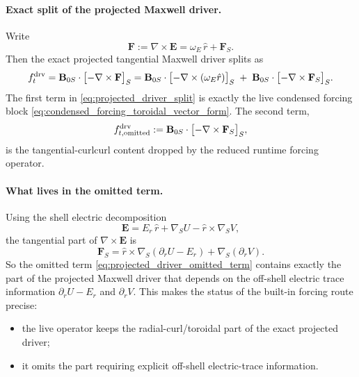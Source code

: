 \documentclass[11pt,a4paper]{article}
\begin{document}
\paragraph{Exact split of the projected Maxwell driver.}
Write
\[
\mathbf F := \nabla\times \mathbf E
=
\omega_E\,\hat r + \mathbf F_S.
\]
Then the exact projected tangential Maxwell driver splits as
\begin{equation}
f_t^{\rm drv}
=
\mathbf B_{0S}\cdot\bigl[-\nabla\times \mathbf F\bigr]_S
=
\mathbf B_{0S}\cdot\bigl[-\nabla\times(\omega_E\hat r)\bigr]_S
\;+\;
\mathbf B_{0S}\cdot\bigl[-\nabla\times \mathbf F_S\bigr]_S.
\label{eq:projected_driver_split}
\end{equation}
The first term in \eqref{eq:projected_driver_split} is exactly the live
condensed forcing block \eqref{eq:condensed_forcing_toroidal_vector_form}. The
second term,
\begin{equation}
f_{t,\rm omitted}^{\rm drv}
:=
\mathbf B_{0S}\cdot\bigl[-\nabla\times \mathbf F_S\bigr]_S,
\label{eq:projected_driver_omitted_term}
\end{equation}
is the tangential-curlcurl content dropped by the reduced runtime forcing
operator.

\paragraph{What lives in the omitted term.}
Using the shell electric decomposition
\[
\mathbf E
=
E_r\,\hat r + \nabla_S U - \hat r\times \nabla_S V,
\]
the tangential part of \(\nabla\times \mathbf E\) is
\[
\mathbf F_S
=
\hat r\times \nabla_S(\partial_r U - E_r)
+
\nabla_S(\partial_r V).
\]
So the omitted term \eqref{eq:projected_driver_omitted_term} contains exactly
the part of the projected Maxwell driver that depends on the off-shell electric
trace information \(\partial_r U - E_r\) and \(\partial_r V\). This makes the
status of the built-in forcing route precise:
\begin{itemize}
\item the live operator keeps the radial-curl/toroidal part of the exact
projected driver;
\item it omits the part requiring explicit off-shell electric-trace
information.
\end{itemize}
\end{document}
